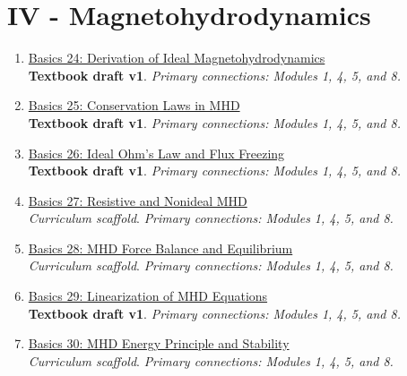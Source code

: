 \documentclass[11pt]{article}
\begin{document}
\section{IV - Magnetohydrodynamics}
\begin{enumerate}[leftmargin=2.4em]
\item[\textbf{24.}] \href{run:basics_24_derivation_of_ideal_magnetohydrodynamics.pdf}{Basics 24: Derivation of Ideal Magnetohydrodynamics}\\[-0.2em]
\textbf{Textbook draft v1}. \textit{Primary connections: Modules 1, 4, 5, and 8.}
\item[\textbf{25.}] \href{run:basics_25_conservation_laws_in_mhd.pdf}{Basics 25: Conservation Laws in MHD}\\[-0.2em]
\textbf{Textbook draft v1}. \textit{Primary connections: Modules 1, 4, 5, and 8.}
\item[\textbf{26.}] \href{run:basics_26_ideal_ohms_law_and_flux_freezing.pdf}{Basics 26: Ideal Ohm's Law and Flux Freezing}\\[-0.2em]
\textbf{Textbook draft v1}. \textit{Primary connections: Modules 1, 4, 5, and 8.}
\item[\textbf{27.}] \href{run:basics_27_resistive_and_nonideal_mhd.pdf}{Basics 27: Resistive and Nonideal MHD}\\[-0.2em]
\textit{Curriculum scaffold}. \textit{Primary connections: Modules 1, 4, 5, and 8.}
\item[\textbf{28.}] \href{run:basics_28_mhd_force_balance_and_equilibrium.pdf}{Basics 28: MHD Force Balance and Equilibrium}\\[-0.2em]
\textit{Curriculum scaffold}. \textit{Primary connections: Modules 1, 4, 5, and 8.}
\item[\textbf{29.}] \href{run:basics_29_linearization_of_mhd_equations.pdf}{Basics 29: Linearization of MHD Equations}\\[-0.2em]
\textbf{Textbook draft v1}. \textit{Primary connections: Modules 1, 4, 5, and 8.}
\item[\textbf{30.}] \href{run:basics_30_mhd_energy_principle_and_stability.pdf}{Basics 30: MHD Energy Principle and Stability}\\[-0.2em]
\textit{Curriculum scaffold}. \textit{Primary connections: Modules 1, 4, 5, and 8.}
\end{enumerate}
\end{document}
